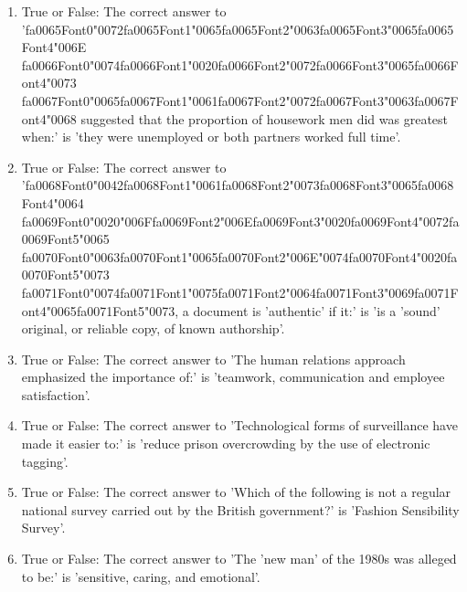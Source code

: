 \documentclass[12pt]{article}
\begin{document}
\begin{enumerate}[label=\arabic*.]
\item True or False: The correct answer to '{\csname fa0065Font0\endcsname\char"0072}{\csname fa0065Font1\endcsname\char"0065}{\csname fa0065Font2\endcsname\char"0063}{\csname fa0065Font3\endcsname\char"0065}{\csname fa0065Font4\endcsname\char"006E} {\csname fa0066Font0\endcsname\char"0074}{\csname fa0066Font1\endcsname\char"0020}{\csname fa0066Font2\endcsname\char"0072}{\csname fa0066Font3\endcsname\char"0065}{\csname fa0066Font4\endcsname\char"0073} {\csname fa0067Font0\endcsname\char"0065}{\csname fa0067Font1\endcsname\char"0061}{\csname fa0067Font2\endcsname\char"0072}{\csname fa0067Font3\endcsname\char"0063}{\csname fa0067Font4\endcsname\char"0068} suggested that the proportion of housework men did was greatest when:' is 'they were unemployed or both partners worked full time'.
\item True or False: The correct answer to '{\csname fa0068Font0\endcsname\char"0042}{\csname fa0068Font1\endcsname\char"0061}{\csname fa0068Font2\endcsname\char"0073}{\csname fa0068Font3\endcsname\char"0065}{\csname fa0068Font4\endcsname\char"0064} {\csname fa0069Font0\endcsname\char"0020}{\char"006F}{\csname fa0069Font2\endcsname\char"006E}{\csname fa0069Font3\endcsname\char"0020}{\csname fa0069Font4\endcsname\char"0072}{\csname fa0069Font5\endcsname\char"0065} {\csname fa0070Font0\endcsname\char"0063}{\csname fa0070Font1\endcsname\char"0065}{\csname fa0070Font2\endcsname\char"006E}{\char"0074}{\csname fa0070Font4\endcsname\char"0020}{\csname fa0070Font5\endcsname\char"0073} {\csname fa0071Font0\endcsname\char"0074}{\csname fa0071Font1\endcsname\char"0075}{\csname fa0071Font2\endcsname\char"0064}{\csname fa0071Font3\endcsname\char"0069}{\csname fa0071Font4\endcsname\char"0065}{\csname fa0071Font5\endcsname\char"0073}, a document is 'authentic' if it:' is 'is a 'sound' original, or reliable copy, of known authorship'.
\item True or False: The correct answer to 'The human relations approach emphasized the importance of:' is 'teamwork, communication and employee satisfaction'.
\item True or False: The correct answer to 'Technological forms of surveillance have made it easier to:' is 'reduce prison overcrowding by the use of electronic tagging'.
\item True or False: The correct answer to 'Which of the following is not a regular national survey carried out by the British government?' is 'Fashion Sensibility Survey'.
\item True or False: The correct answer to 'The 'new man' of the 1980s was alleged to be:' is 'sensitive, caring, and emotional'.

\end{enumerate}
\end{document}
